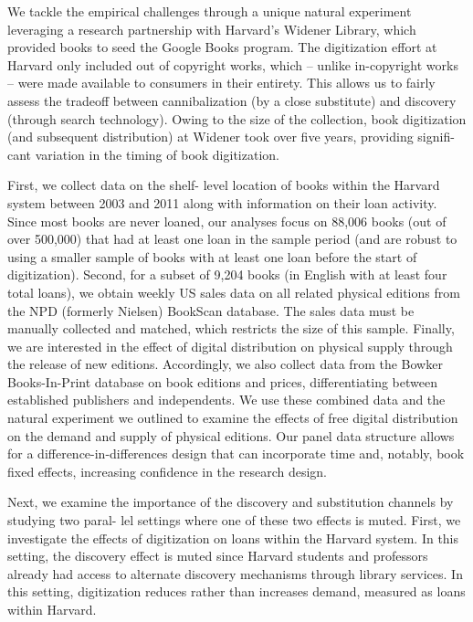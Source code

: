 \documentclass{article}
\begin{document}
We tackle the empirical challenges through a unique natural experiment leveraging a research partnership with Harvard’s Widener Library, which provided books to seed the Google Books program. The digitization effort at Harvard only included out of copyright works, which – unlike in-copyright works – were made available to consumers in their entirety. This allows us to fairly assess the tradeoff between cannibalization (by a close substitute) and discovery (through search technology). Owing to the size of the collection, book digitization (and subsequent distribution) at Widener took over five years, providing signifi- cant variation in the timing of book digitization.

First, we collect data on the shelf- level location of books within the Harvard system between 2003 and 2011 along with information on their loan activity. Since most books are never loaned, our analyses focus on 88,006 books (out of over 500,000) that had at least one loan in the sample period (and are robust to using a smaller sample of books with at least one loan before the start of digitization). Second, for a subset of 9,204 books (in English with at least four total loans), we obtain weekly US sales data on all related physical editions from the NPD (formerly Nielsen) BookScan database. The sales data must be manually collected and matched, which restricts the size of this sample. Finally, we are interested in the effect of digital distribution on physical supply through the release of new editions. Accordingly, we also collect data from the Bowker Books-In-Print database on book editions and prices, differentiating between established publishers and independents. We use these combined data and the natural experiment we outlined to examine the effects of free digital distribution on the demand and supply of physical editions. Our panel data structure allows for a difference-in-differences design that can incorporate time and, notably, book fixed effects, increasing confidence in the research design.

Next, we examine the importance of the discovery and substitution channels by studying two paral- lel settings where one of these two effects is muted. First, we investigate the effects of digitization on loans within the Harvard system. In this setting, the discovery effect is muted since Harvard students and professors already had access to alternate discovery mechanisms through library services. In this setting, digitization reduces rather than increases demand, measured as loans within Harvard. 
\end{document}

